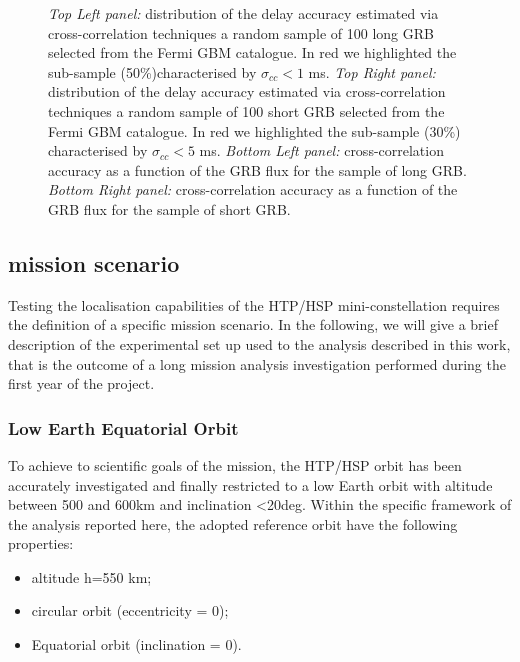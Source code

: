 \documentclass[]{spie}  %
\begin{document}
\begin{figure}
\begin{center}
\begin{tabular}{cc}
\end{tabular}
\end{center}
\caption[example] 
{ \label{fig:sigma_sample} 
\emph{Top Left panel:} distribution of the delay accuracy estimated via cross-correlation techniques a random sample of 100 long GRB selected from the Fermi GBM catalogue. In red we highlighted the sub-sample (50\%)characterised by $\sigma_{cc} < 1$ ms. \emph{Top Right panel:} distribution of the delay accuracy estimated via cross-correlation techniques a random sample of 100 short GRB selected from the Fermi GBM catalogue. In red we highlighted the sub-sample (30\%) characterised by $\sigma_{cc} < 5$ ms. \emph{Bottom Left panel:} cross-correlation accuracy as a function of the GRB flux for the sample of long GRB. \emph{Bottom Right panel:} cross-correlation accuracy as a function of the GRB flux for the sample of short GRB.}
\end{figure}


\subsection{mission scenario}
Testing the localisation capabilities of the HTP/HSP mini-constellation requires the definition of a specific mission scenario. In the following, we will give a brief description of the experimental set up used to the analysis described in this work, that is the outcome of a long mission analysis investigation performed during the first year of the project.

\subsubsection{Low Earth Equatorial Orbit}
To achieve to scientific goals of the mission, the HTP/HSP orbit has been accurately investigated and finally restricted to a low Earth orbit with altitude between 500 and 600km and inclination <20deg. Within the specific framework of the analysis reported here, the adopted reference orbit have the following properties:

\begin{itemize}
\item altitude h=550 km;
\item circular orbit (eccentricity = 0);
\item Equatorial orbit (inclination = 0).
\end{itemize}
\end{document}

